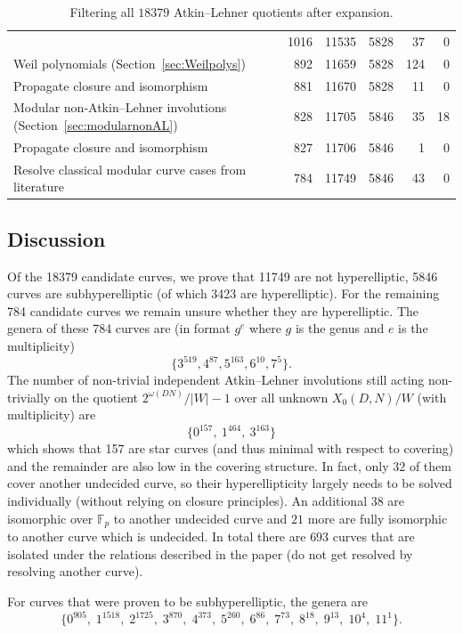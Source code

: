 \documentclass[12pt]{amsart}
\newcommand{\F}{\mathbb{F}}
\numberwithin{equation}{subsection}
\theoremstyle{plain}\newtheorem{ithm}{Theorem}
\theoremstyle{plain}\newtheorem{iprop}[ithm]{Proposition}
\theoremstyle{definition}
\theoremstyle{remark}
\newcommand{\Curve}[2]{X_0({#1},{#2})} %
\begin{document}
\begin{table}[ht]
\begin{tabularx}{\textwidth}{Xrrrrr}
& 1016 & 11535 & 5828 & 37 & 0 \\
Weil polynomials (Section~\ref{sec:Weilpolys})
& 892 & 11659 & 5828 & 124 & 0 \\
Propagate closure and isomorphism
& 881 & 11670 & 5828 & 11 & 0 \\
Modular non-Atkin--Lehner involutions (Section~\ref{sec:modularnonAL})
& 828 & 11705 & 5846 & 35 & 18 \\
Propagate closure and isomorphism
& 827 & 11706 & 5846 & 1 & 0 \\
Resolve classical modular curve cases from literature
& 784 & 11749 & 5846 & 43 & 0 \\
\hline
\end{tabularx}
\caption{Filtering all $18379$ Atkin--Lehner quotients after expansion.}
\label{tab:quotient-filtering}
\end{table}


\subsection{Discussion}
Of the 18379 candidate curves, we prove that 11749 are not hyperelliptic, 5846  curves are subhyperelliptic (of which 3423 are hyperelliptic).
For the remaining 784 candidate curves we remain unsure whether they are hyperelliptic. 
The genera of these 784 curves are (in format $g^e$ where $g$ is the genus and  $e$ is the multiplicity)
\[\{ 3^{519}, 4^{87}, 5^{163}, 6^{10}, 7^5 \}. \]
The number of non-trivial independent Atkin--Lehner involutions still acting non-trivially on the quotient $2^{\omega(DN)}/|W| - 1$ over all unknown  $\Curve{D}{N}/W$ (with multiplicity) are
\[  \{ 0^{157},\ 1^{464},\ 3^{163} \} \]
which shows that 157 are star curves (and thus minimal with respect to covering) and the remainder are also low in the covering structure. 
In fact, only $32$ of them cover another undecided curve, so their hyperellipticity largely needs to be solved individually (without relying on closure principles). 
An additional $38$ are isomorphic over $\F_p$ to another undecided curve and $21$ more are fully isomorphic to another curve which is undecided.  
In total there are $693$ curves that are isolated under the relations described in the paper (do not get resolved by resolving another curve).

For curves that were proven to be subhyperelliptic, the genera  are
\[\{0^{905},\;
1^{1518},\;
2^{1725},\;
3^{870},\;
4^{373},\;
5^{260},\;
6^{86},\;
7^{73},\;
8^{18},\;
9^{13},\;
10^{4},\;
11^{1}\}.\] 
\end{document}
